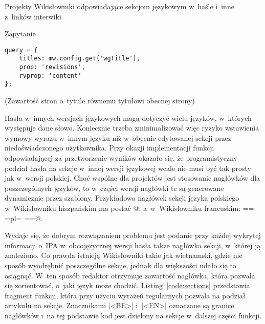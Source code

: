 \begin{opis}
\item[Projekty] Wikisłowniki odpowiadające sekcjom językowym w~haśle i~inne z~linków interwiki
\item[Zapytanie]
\begin{verbatim}
query = {
    titles: mw.config.get('wgTitle'),
    prop: 'revisions',
    rvprop: 'content'
};
\end{verbatim}
(Zawartość stron o~tytule równemu tytułowi obecnej strony)
\end{opis}

Hasła w~innych wersjach językowych mogą dotyczyć wielu języków, w~których występuje dane słowo. Koniecznie trzeba zminimalizować więc ryzyko wstawienia wymowy wyrazu w~innym języku niż w~obecnie edytowanej sekcji przez niedoświadczonego użytkownika. Przy okazji implementacji funkcji odpowiadającej za przetworzenie wyników okazało się, że programistyczny podział hasła na sekcje w~innej wersji językowej wcale nie musi być tak prosty jak w~wersji polskiej. Choć wspólne dla projektów jest stosowanie nagłówków dla poszczególnych języków, to w~części wersji nagłówki te są generowane dynamicznie przez szablony. Przykładowo nagłówek sekcji języka polskiego w~Wikisłowniku hiszpańskim ma postać @, a~w~Wikisłowniku francuskim: \kod@== {{=pl=}} ==@.

Wydaje się, że dobrym rozwiązaniem problemu jest podanie przy każdej wykrytej informacji o~IPA w~obcojęzycznej wersji hasła także nagłówka sekcji, w~której ją znaleziono. Co prawda istnieją Wikisłowniki takie jak wietnamski, gdzie nie sposób wyodrębnić poszczególne sekcje, jednak dla większości udało się to osiągnąć. W~ten sposób redaktor otrzymuje zawartość nagłówka, która pozwala się zorientować, o~jaki język może chodzić. Listing~\ref{code:sections} przedstawia fragment funkcji, która przy użyciu wyrażeń regularnych pozwala na podział artykułu na sekcje. Znacznikami \kod|<BE>| i~\kod|<EN>| oznaczane są granice nagłówków i~na tej podstawie kod jest dzielony na sekcje w~dalszej części funkcji.

